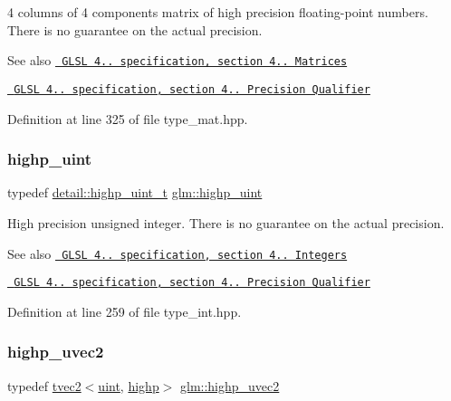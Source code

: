 4 columns of 4 components matrix of high precision floating-\/point numbers. There is no guarantee on the actual precision.

\begin{DoxySeeAlso}{See also}
\href{http://www.opengl.org/registry/doc/GLSLangSpec.4.20.8.pdf}{\texttt{ G\+L\+SL 4.. specification, section 4.. Matrices}} 

\href{http://www.opengl.org/registry/doc/GLSLangSpec.4.20.8.pdf}{\texttt{ G\+L\+SL 4.. specification, section 4.. Precision Qualifier}} 
\end{DoxySeeAlso}


Definition at line 325 of file type\+\_\+mat.\+hpp.

\mbox{\label{group__core__precision_gabfd1cf11193324a5f77d3831b6ac3205}} 
\subsubsection{\texorpdfstring{highp\_uint}{highp\_uint}}
{\footnotesize\ttfamily typedef \mbox{\hyperlink{namespaceglm_1_1detail_a994c05c8a976cc902a7cd193ad36bbba}{detail\+::highp\+\_\+uint\+\_\+t}} \mbox{\hyperlink{group__core__precision_gabfd1cf11193324a5f77d3831b6ac3205}{glm\+::highp\+\_\+uint}}}

High precision unsigned integer. There is no guarantee on the actual precision.

\begin{DoxySeeAlso}{See also}
\href{http://www.opengl.org/registry/doc/GLSLangSpec.4.20.8.pdf}{\texttt{ G\+L\+SL 4.. specification, section 4.. Integers}} 

\href{http://www.opengl.org/registry/doc/GLSLangSpec.4.20.8.pdf}{\texttt{ G\+L\+SL 4.. specification, section 4.. Precision Qualifier}} 
\end{DoxySeeAlso}


Definition at line 259 of file type\+\_\+int.\+hpp.

\mbox{\label{group__core__precision_ga386eaa1579a0f5ad51cd7d8fcd52ec16}} 
\subsubsection{\texorpdfstring{highp\_uvec2}{highp\_uvec2}}
{\footnotesize\ttfamily typedef \mbox{\hyperlink{structglm_1_1tvec2}{tvec2}}$<$\mbox{\hyperlink{group__core__precision_ga4fd29415871152bfb5abd588334147c8}{uint}}, \mbox{\hyperlink{namespaceglm_a0f04f086094c747d227af4425893f545ac6f7eab42eacbb10d59a58e95e362074}{highp}}$>$ \mbox{\hyperlink{group__core__precision_ga386eaa1579a0f5ad51cd7d8fcd52ec16}{glm\+::highp\+\_\+uvec2}}}

